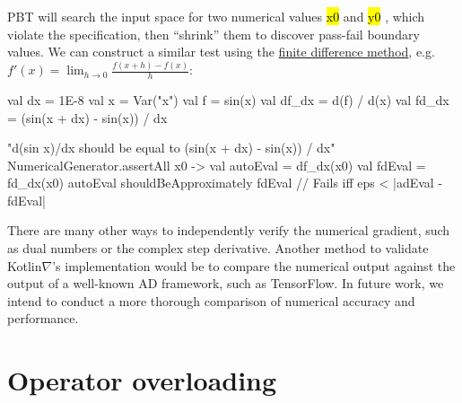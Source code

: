 \documentclass[12pt,initial,twoside,maitrise]{dms}
\newcommand{\inline}[1]{%
    \begingroup%
    \sethlcolor{slightgray}%
    \hl{\ttfamily\small #1}%
    \endgroup
}
\numberwithin{equation}{section}
\numberwithin{table}{chapter}
\numberwithin{figure}{chapter}
\begin{document}
%
PBT will search the input space for two numerical values \inline{x0} and \inline{y0}, which violate the specification, then ``shrink'' them to discover pass-fail boundary values. We can construct a similar test using the \hyperref[sec:fdm]{finite difference method}, e.g. $f'(x)=\lim _{h\to 0}{\frac {f(x+h)-f(x)}{h}}$:
%
\begin{kotlinlisting}
val dx = 1E-8
val x = Var("x")
val f = sin(x)
val df_dx = d(f) / d(x)
val fd_dx = (sin(x + dx) - sin(x)) / dx

"d(sin x)/dx should be equal to (sin(x + dx) - sin(x)) / dx" {
    NumericalGenerator.assertAll { x0 ->
        val autoEval = df_dx(x0)
        val fdEval = fd_dx(x0)
        autoEval shouldBeApproximately fdEval // Fails iff eps < |adEval - fdEval|
    }
}
\end{kotlinlisting}
%
There are many other ways to independently verify the numerical gradient, such as dual numbers or the complex step derivative. Another method to validate Kotlin$\nabla$'s implementation would be to compare the numerical output against the output of a well-known AD framework, such as TensorFlow. In future work, we intend to conduct a more thorough comparison of numerical accuracy and performance.

\section{Operator overloading}\label{sec:operator-overloading}
\end{document}
